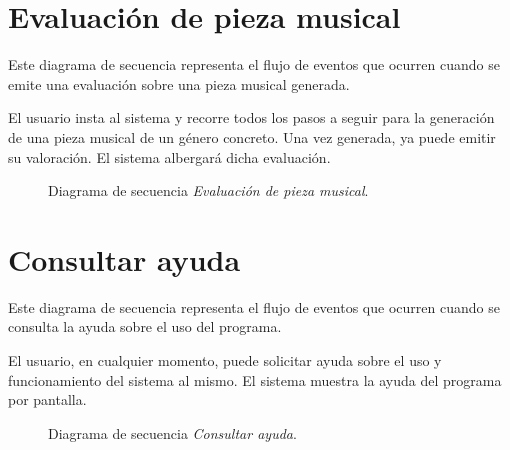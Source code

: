 \section{Evaluación de pieza musical}

Este diagrama de secuencia representa el flujo de eventos que ocurren cuando se emite una evaluación sobre una pieza musical generada.

El usuario insta al sistema y recorre todos los pasos a seguir para la generación de una pieza musical de un género concreto. Una vez generada, ya puede emitir su valoración. El sistema albergará dicha evaluación.

\begin{figure}[H]
  \centering
  
  \caption{Diagrama de secuencia \emph{Evaluación de pieza musical}.}
\end{figure}

\section{Consultar ayuda}

Este diagrama de secuencia representa el flujo de eventos que ocurren cuando se consulta la ayuda sobre el uso del programa.

El usuario, en cualquier momento, puede solicitar ayuda sobre el uso y funcionamiento del sistema al mismo. El sistema muestra la ayuda del programa por pantalla.

\begin{figure}[H]
  \centering
  
  \caption{Diagrama de secuencia \emph{Consultar ayuda}.}
\end{figure}